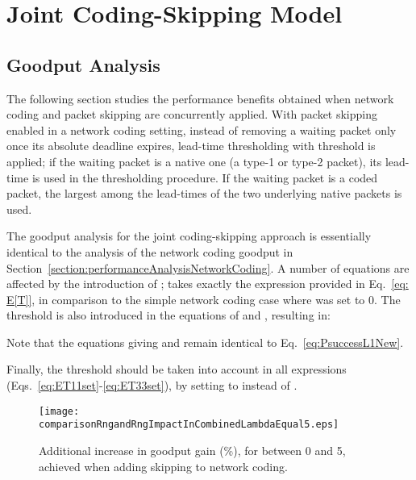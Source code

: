 \documentclass[preprint,12pt]{elsarticle}
\theoremstyle{definition}
\theoremstyle{plain}
\theoremstyle{remark}
\begin{document}
\section{Joint Coding-Skipping Model} \label{section:joint}

\subsection{Goodput Analysis} \label{section:analysis-network-joint}

The following section studies the performance benefits obtained when network coding and packet skipping are concurrently applied. With packet skipping enabled in a network coding setting, instead of removing a waiting packet only once its absolute deadline expires, lead-time thresholding with threshold  is applied; if the waiting packet is a native one (a type-1 or type-2 packet), its lead-time is used in the thresholding procedure. If the waiting packet is a coded packet, the largest among the lead-times of the two underlying native packets is used.

The goodput analysis for the joint coding-skipping approach is essentially identical to the analysis of the network coding goodput in Section~\ref{section:performanceAnalysisNetworkCoding}. A number of equations are affected by the introduction of ;  takes exactly the expression provided in Eq.~\eqref{eq: E[T]}, in comparison to the simple network coding case where  was set to 0. The threshold  is also introduced in the equations of  and , resulting in:





Note that the equations giving  and  remain identical to Eq.~\eqref{eq:PsuccessL1New}.

Finally, the threshold  should be taken into account in all  expressions (Eqs.~\eqref{eq:ET11set}-\eqref{eq:ET33set}), by setting  to  instead of .




\begin{figure}[t]
\begin{center}
  \texttt{[image: comparisonRngandRngImpactInCombinedLambdaEqual5.eps]}
\end{center}
  \caption{Additional increase in goodput gain (\%), for  between 0 and 5, achieved when adding skipping to network coding.}
  \label{fig:comparisonRngandRngImpactInCombinedLambdaEqual5}
\end{figure}
\end{document}
